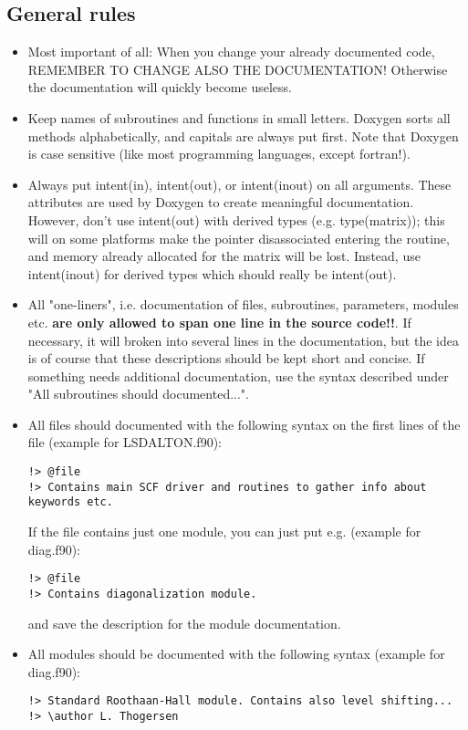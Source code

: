 \documentclass[preprint,aps]{revtex4}
\begin{document}
\subsection{General rules}
\begin{itemize}
\item Most important of all: When you change your already documented code, REMEMBER TO CHANGE ALSO THE DOCUMENTATION! Otherwise
the documentation will quickly become useless.
\item Keep names of subroutines and functions in small letters. Doxygen sorts all methods alphabetically, and capitals are 
always put first. Note that Doxygen is case sensitive (like most programming languages, except fortran!).
\item Always put intent(in), intent(out), or intent(inout) on all arguments. These attributes are used by Doxygen to create 
meaningful documentation. However, don't use intent(out) with derived types (e.g. type(matrix)); this will on some platforms 
make the pointer disassociated entering the routine, and memory already allocated for the matrix will be lost. Instead, use 
intent(inout) for derived types which should really be intent(out).
\item All "one-liners", i.e. documentation of files, subroutines, parameters, modules etc. {\bf {are only allowed to span one line
in the source code!!}}. If necessary, it will broken into several lines in the documentation, but the idea is of course
that these descriptions should be kept short and concise. If something needs additional documentation, use the syntax described
under "All subroutines should documented...".
\item All files should documented with the following syntax on the first lines of the file (example for LSDALTON.f90):
\begin{verbatim}
!> @file 
!> Contains main SCF driver and routines to gather info about keywords etc.
\end{verbatim}
If the file contains just one module, you can just put e.g. (example for diag.f90):
\begin{verbatim}
!> @file 
!> Contains diagonalization module.
\end{verbatim}
and save the description for the module documentation.
\item All modules should be documented with the following syntax (example for diag.f90):
\begin{verbatim}
!> Standard Roothaan-Hall module. Contains also level shifting...
!> \author L. Thogersen

\end{verbatim}
\end{itemize}
\end{document}
